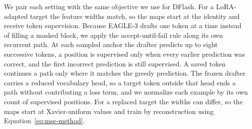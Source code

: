 We pair each setting with the same objective we use for DFlash. For a LoRA-adapted target the feature widths match, so the maps start at the identity and receive token supervision. Because EAGLE-3 drafts one token at a time instead of filling a masked block, we apply the accept-until-fail rule along its own recurrent path. At each sampled anchor the drafter predicts up to eight successive tokens, a position is supervised only when every earlier prediction was correct, and the first incorrect prediction is still supervised. A saved token continues a path only where it matches the greedy prediction. The frozen drafter carries a reduced vocabulary head, so a target token outside that head ends a path without contributing a loss term, and we normalize each example by its own count of supervised positions. For a replaced target the widths can differ, so the maps start at Xavier-uniform values and train by reconstruction using Equation~\ref{eq:mse-method}.


